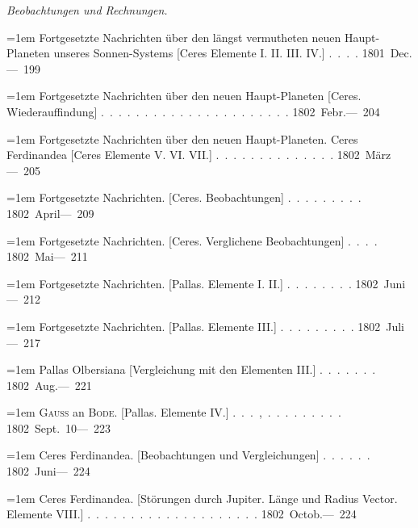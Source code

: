 \par\medskip
\noindent\textit{Beobachtungen und Rechnungen.}\par\smallskip\nopagebreak[4]
\noindent\hangindent=1em Fortgesetzte Nachrichten über den längst vermutheten neuen Haupt-Planeten unseres Sonnen-Systems [Ceres Elemente I. II. III. IV.] \mbox{.\ .\ .\ .} \hfill\mbox{1801 Dec.}\quad\mbox{--- 199}\par\smallskip
\noindent\hangindent=1em Fortgesetzte Nachrichten über den neuen Haupt-Planeten [Ceres. Wiederauffindung] \mbox{.\ .\ .\ .\ .\ .\ .\ .\ .\ .\ .\ .\ .\ .\ .\ .\ .\ .\ .\ .\ .\ .} \hfill\mbox{1802 Febr.}\quad\mbox{--- 204}\par\smallskip
\noindent\hangindent=1em Fortgesetzte Nachrichten über den neuen Haupt-Planeten. Ceres Ferdinandea [Ceres Elemente V. VI. VII.] \mbox{.\ .\ .\ .\ .\ .\ .\ .\ .\ .\ .\ .\ .\ .} \hfill\mbox{1802 März}\quad\mbox{--- 205}\par\smallskip
\noindent\hangindent=1em Fortgesetzte Nachrichten. [Ceres. Beobachtungen] \mbox{.\ .\ .\ .\ .\ .\ .\ .\ .} \hfill\mbox{1802 April}\quad\mbox{--- 209}\par\smallskip
\noindent\hangindent=1em Fortgesetzte Nachrichten. [Ceres. Verglichene Beobachtungen] \mbox{.\ .\ .\ .} \hfill\mbox{1802 Mai}\quad\mbox{--- 211}\par\smallskip
\noindent\hangindent=1em Fortgesetzte Nachrichten. [Pallas. Elemente I. II.] \mbox{.\ .\ .\ .\ .\ .\ .\ .} \hfill\mbox{1802 Juni}\quad\mbox{--- 212}\par\smallskip
\noindent\hangindent=1em Fortgesetzte Nachrichten. [Pallas. Elemente III.] \mbox{.\ .\ .\ .\ .\ .\ .\ .\ .} \hfill\mbox{1802 Juli}\quad\mbox{--- 217}\par\smallskip
\noindent\hangindent=1em Pallas Olbersiana [Vergleichung mit den Elementen III.] \mbox{.\ .\ .\ .\ .\ .\ .} \hfill\mbox{1802 Aug.}\quad\mbox{--- 221}\par\smallskip
\noindent\hangindent=1em \textsc{Gauss} an \textsc{Bode}. [Pallas. Elemente IV.] \mbox{.\ .\ .\ ,\ .\ .\ .\ .\ .\ .\ .\ .\ .} \hfill\mbox{1802 Sept. 10}\quad\mbox{--- 223}\par\smallskip
\noindent\hangindent=1em Ceres Ferdinandea. [Beobachtungen und Vergleichungen] \mbox{.\ .\ .\ .\ .\ .} \hfill\mbox{1802 Juni}\quad\mbox{--- 224}\par\smallskip
\noindent\hangindent=1em Ceres Ferdinandea. [Störungen durch Jupiter. Länge und Radius Vector. Elemente VIII.] \mbox{.\ .\ .\ .\ .\ .\ .\ .\ .\ .\ .\ .\ .\ .\ .\ .\ .\ .\ .\ .} \hfill\mbox{1802 Octob.}\quad\mbox{--- 224}\par\smallskip
